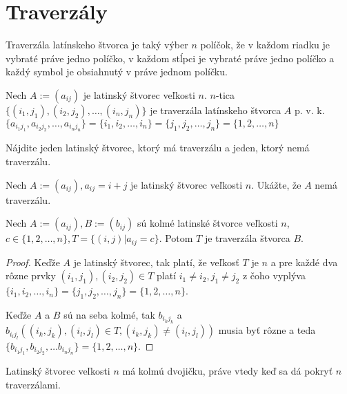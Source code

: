 \section{Traverzály}
Traverzála latínskeho štvorca je taký výber $n$ políčok, že v každom riadku je vybraté práve jedno políčko, v každom stĺpci je vybraté práve jedno políčko a každý symbol je obsiahnutý v práve jednom políčku.

\begin{definition}
Nech $A := (a_{ij})$ je latinský štvorec veľkosti $n$. $n$-tica $\{(i_1, j_1), (i_2,j_2), \dots , (i_n,j_n)\}$ je traverzála latínskeho štvorca $A$ p. v. k.  $\{a_{i_1j_1},a_{i_2j_2}, \dots, a_{i_nj_n}\} = \{i_1, i_2, \dots, i_n \} = \{ j_1, j_2, \dots, j_n\} = \{1, 2, \dots, n \}$
\end{definition}

\begin{exercise}
Nájdite jeden latinský štvorec, ktorý má traverzálu a jeden, ktorý nemá traverzálu. 
\end{exercise}

\begin{exercise}
Nech $A := (a_{ij}),a_{ij} = i+j $ je latinský štvorec veľkosti $n$. Ukážte, že $A$ nemá traverzálu.
\end{exercise}

\begin{theorem}
Nech $A := (a_{ij}), B:=(b_{ij})$ sú kolmé latinské štvorce veľkosti $n$, $c \in \{1,2,\dots,n\} , T = \{ (i,j) | a_{ij} = c\}$. Potom $T$ je traverzála štvorca $B$.
\end{theorem}

\begin{proof}
Keďže $A$ je latinský štvorec, tak platí, že veľkosť $T$ je $n$ a pre každé dva rôzne prvky $(i_1, j_1), (i_2,j_2) \in T$ platí $i_1 \neq i_2 ,j_1 \neq j_2$ 
z čoho vyplýva $\{i_1,i_2, \dots, i_n\} = \{j_1, j_2, \dots, j_n\} = \{ 1, 2, \dots, n\}$.

Keďže $A$ a $B$ sú na seba kolmé, tak $b_{i_k j_k}$ a $b_{i_l j_l} ((i_k, j_k), (i_l, j_l) \in T, (i_k, j_k) \neq (i_l, j_l))$ musia byť rôzne a teda $\{b_{i_1j_1},b_{i_2j_2}, \dots b_{i_nj_n}\} = \{1,2, \dots , n\}$.
\end{proof}

\begin{corollary}
Latinský štvorec veľkosti $n$ má kolmú dvojičku, práve vtedy keď sa dá pokryť $n$ traverzálami.
\end{corollary}


